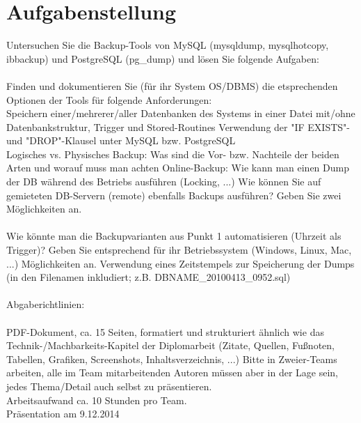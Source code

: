 \documentclass[10pt]{article}
\begin{document}
\section{Aufgabenstellung}
Untersuchen Sie die Backup-Tools von MySQL (mysqldump, mysqlhotcopy, ibbackup) und PostgreSQL (pg\_dump) und lösen Sie folgende Aufgaben:
\\ \\
Finden und dokumentieren Sie (für ihr System OS/DBMS) die etsprechenden Optionen der Tools für folgende Anforderungen: \\
Speichern einer/mehrerer/aller Datenbanken des Systems in einer Datei mit/ohne Datenbankstruktur, Trigger und Stored-Routines 
Verwendung der "IF EXISTS"- und "DROP"-Klausel unter MySQL bzw. PostgreSQL \\
Logisches vs. Physisches Backup: Was sind die Vor- bzw. Nachteile der beiden Arten und worauf muss man achten
Online-Backup: Wie kann man einen Dump der DB während des Betriebs ausführen (Locking, ...)
Wie können Sie auf gemieteten DB-Servern (remote) ebenfalls Backups ausführen? Geben Sie zwei Möglichkeiten an.
\\ \\
Wie könnte man die Backupvarianten aus Punkt 1 automatisieren (Uhrzeit als Trigger)? Geben Sie entsprechend für ihr Betriebssystem (Windows, Linux, Mac, ...) Möglichkeiten an.
Verwendung eines Zeitstempels zur Speicherung der Dumps (in den Filenamen inkludiert; z.B. DBNAME\_20100413\_0952.sql)
\\ \\
Abgaberichtlinien:
 \\ \\
PDF-Dokument, ca. 15 Seiten, formatiert und strukturiert ähnlich wie das Technik-/Machbarkeits-Kapitel der Diplomarbeit (Zitate, Quellen, Fußnoten, Tabellen, Grafiken, Screenshots, Inhaltsverzeichnis, ...)
Bitte in Zweier-Teams arbeiten, alle im Team mitarbeitenden Autoren müssen aber in der Lage sein, jedes Thema/Detail auch selbst zu präsentieren. \\
Arbeitsaufwand ca. 10 Stunden pro Team.  \\
Präsentation am 9.12.2014
\end{document}
